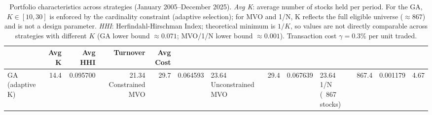 \begin{table}
\caption{Portfolio characteristics across strategies (January 2005--December 2025). \textit{Avg K}: average number of stocks held per period. For the GA, $K \in [10, 30]$ is enforced by the cardinality constraint (adaptive selection); for MVO and 1/N, K reflects the full eligible universe ($\approx 867$) and is not a design parameter. \textit{HHI}: Herfindahl-Hirschman Index; theoretical minimum is $1/K$, so values are not directly comparable across strategies with different $K$ (GA lower bound $\approx 0.071$; MVO/1/N lower bound $\approx 0.001$). Transaction cost $\gamma = 0.3\%$ per unit traded.}
\label{tab:characteristics}
\begin{tabular}{lrrrr}
\toprule
 & Avg K & Avg HHI & Turnover & Avg Cost \\
\midrule
GA (adaptive K) & 14.4 & 0.095700 & 21.34%
Constrained MVO & 29.7 & 0.064593 & 23.64%
Unconstrained MVO & 29.4 & 0.067639 & 23.64%
1/N (~867 stocks) & 867.4 & 0.001179 & 4.67%
\bottomrule
\end{tabular}
\end{table}
